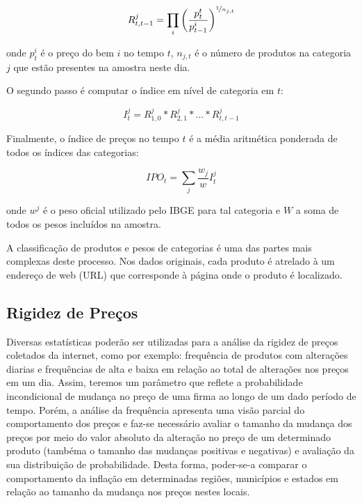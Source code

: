 \begin{algorithm}[H]
\begin{equation}\label{eq01en01}
R_{t,t-1}^{j}=\prod_{i}\left(\frac{p_{t}^{t}}{p_{t-1}^{i}}\right)^{\nicefrac{1}{n_{j,t}}}
\end{equation}

\noindent onde $p_{t}^{i}$ é o preço do bem $i$ no tempo $t$, $n_{j,t}$ é o número de produtos na categoria $j$ que estão presentes na amostra neste dia. 

O segundo passo é computar o índice em nível de categoria em $t$:

\begin{equation}\label{eq02en01}
I_{t}^{j}=R_{1,0}^{j}\ast{R}_{2,1}^{j}\ast{...}\ast{R}_{t,t-1}^{j}
\end{equation}

Finalmente, o índice de preços no tempo $t$ é a média aritmética ponderada de todos os índices das categorias:

\begin{equation}\label{eq03en01}
IPO_{t}=\sum_{j}{\frac{w_{j}}{w}I_{t}^{j}} 
\end{equation}

\noindent onde $w^{j}$ é o peso oficial utilizado pelo IBGE para tal categoria e $W$ a soma de todos os pesos incluídos na amostra.

A classificação de produtos e pesos de categorias é uma das partes mais complexas deste processo. Nos dados originais, cada produto é atrelado à um endereço de web (URL) que corresponde à página onde o produto é localizado. 

\subsection{Rigidez de Preços}

 Diversas estatísticas poderão ser utilizadas para a análise da rigidez de preços coletados da internet, como por exemplo: frequência de produtos com alterações diarias e frequências de alta e baixa em relação ao total de alterações nos preços em um dia. Assim, teremos um parâmetro que reflete a probabilidade incondicional de mudança no preço de uma firma ao longo de um dado período de tempo. Porém, a análise da frequência apresenta uma visão parcial do comportamento dos preços e faz-se necessário avaliar o tamanho da mudança dos preços por meio do valor absoluto da alteração no preço de um determinado produto (tambéma o tamanho das mudanças positivas e negativas) e avaliação da sua distribuição de probabilidade. Desta forma, poder-se-a comparar o comportamento da inflação em determinadas regiões, municípios e estados em relação ao tamanho da mudança nos preços nestes locais. 
 

\end{algorithm}
